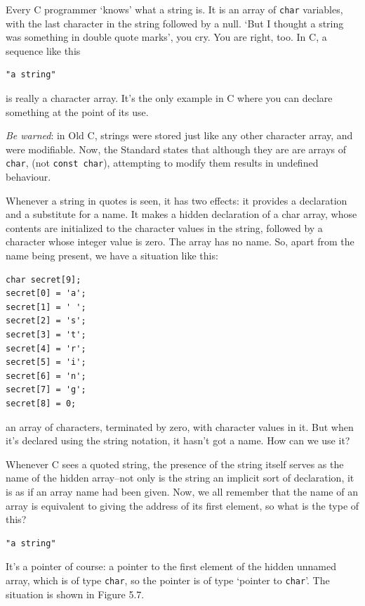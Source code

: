    Every C programmer `knows' what a string is. It is an array of
    \texttt{char} variables, with the last character in the string
    followed by a null. `But I thought a string was something in double
    quote marks', you cry. You are right, too. In C, a sequence like
    this


   \begin{Verbatim}
"a string"
\end{Verbatim}

   is really a character array. It's the only example in C where you can
    declare something at the point of its use.


   \textit{Be warned}: in Old C, strings were stored just like any other
    character array, and were modifiable. Now, the Standard states that
    although they are are arrays of \texttt{char}, (not \texttt{const
    char}), attempting to modify them results in undefined
    behaviour.


   Whenever a string in quotes is seen, it has two effects: it provides
    a declaration and a substitute for a name. It makes a hidden declaration
    of a char array, whose contents are initialized to the character values
    in the string, followed by a character whose integer value is zero. The
    array has no name. So, apart from the name being present, we have
    a situation like this:


   \begin{Verbatim}
char secret[9];
secret[0] = 'a';
secret[1] = ' ';
secret[2] = 's';
secret[3] = 't';
secret[4] = 'r';
secret[5] = 'i';
secret[6] = 'n';
secret[7] = 'g';
secret[8] = 0;
\end{Verbatim}

   an array of characters, terminated by zero, with character values in
    it. But when it's declared using the string notation, it hasn't got
    a name. How can we use it?


   Whenever C sees a quoted string, the presence of the string itself
    serves as the name of the hidden array--not only is the string an
    implicit sort of declaration, it is as if an array name had been given.
    Now, we all remember that the name of an array is equivalent to giving
    the address of its first element, so what is the type of this?


   \begin{Verbatim}
"a string"
\end{Verbatim}

   It's a pointer of course: a pointer to the first element of the hidden
    unnamed array, which is of type \texttt{char}, so the pointer is of
    type `pointer to \texttt{char}'. The situation is shown in
    Figure 5.7.


